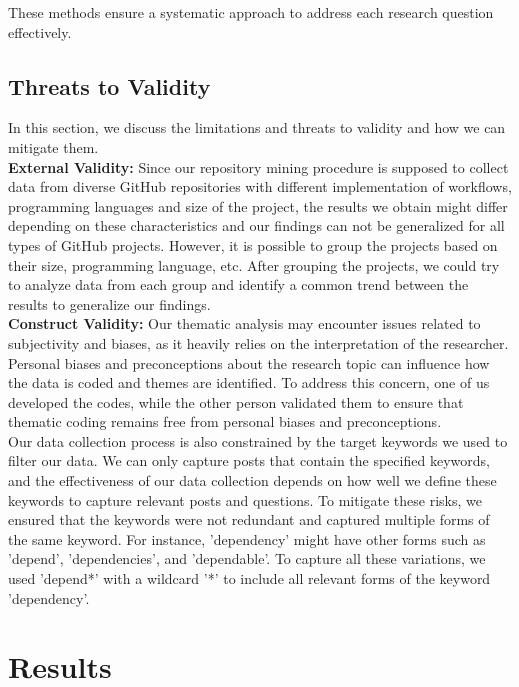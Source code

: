 \documentclass[conference]{IEEEtran}
\begin{document}
                These methods ensure a systematic approach to address each research question effectively.\\


    \subsection{Threats to Validity}
        In this section, we discuss the limitations and threats to
        validity and how we can mitigate them.\\

        \textbf{External Validity:} Since our repository mining procedure is supposed to collect data from diverse GitHub repositories with different implementation of workflows, programming languages and size of the project, the results we obtain might differ depending on these characteristics and our findings can not be generalized for all types of GitHub projects. However, it is possible to group the projects based on their size, programming language, etc. After grouping the projects, we could try to analyze data from each group and identify a common trend between the results to generalize our findings.\\

	\textbf{Construct Validity:} Our thematic analysis may encounter issues related to subjectivity and biases, as it heavily relies on the interpretation of the researcher. Personal biases and preconceptions about the research topic can influence how the data is coded and themes are identified. To address this concern, one of us developed the codes, while the other person validated them to ensure that thematic coding remains free from personal biases and preconceptions.\\
    Our data collection process is also constrained by the target keywords we used to filter our data. We can only capture posts that contain the specified keywords, and the effectiveness of our data collection depends on how well we define these keywords to capture relevant posts and questions. To mitigate these risks, we ensured that the keywords were not redundant and captured multiple forms of the same keyword. For instance, 'dependency' might have other forms such as 'depend', 'dependencies', and 'dependable'. To capture all these variations, we used 'depend*' with a wildcard '*' to include all relevant forms of the keyword 'dependency'.


\section{Results}
\end{document}

